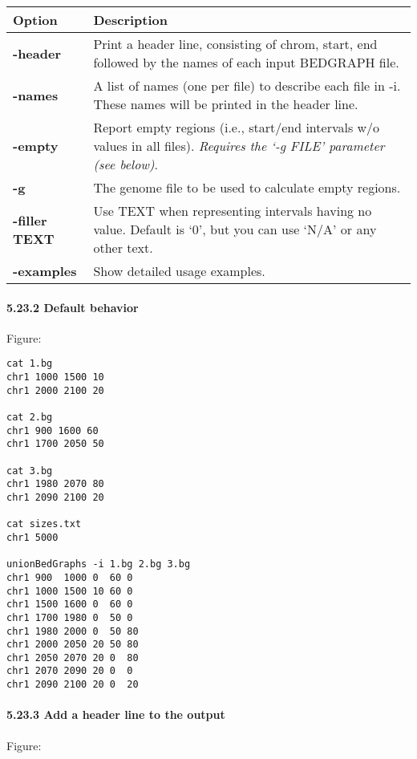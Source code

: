 \documentclass[letterpaper,10pt,english]{sphinxmanual}
\begin{document}
\begin{tabulary}{\linewidth}{|L|L|}
\hline
\textbf{
Option
} & \textbf{
Description
}\\\hline

\textbf{-header}
 & 
Print a header line, consisting of chrom, start, end followed by the names of each input BEDGRAPH file.
\\\hline

\textbf{-names}
 & 
A list of names (one per file) to describe each file in -i. These names will be printed in the header line.
\\\hline

\textbf{-empty}
 & 
Report empty regions (i.e., start/end intervals w/o values in all files). \emph{Requires the `-g FILE' parameter (see below)}.
\\\hline

\textbf{-g}
 & 
The genome file to be used to calculate empty regions.
\\\hline

\textbf{-filler TEXT}
 & 
Use TEXT when representing intervals having no value. Default is `0', but you can use `N/A' or any other text.
\\\hline

\textbf{-examples}
 & 
Show detailed usage examples.
\\\hline
\end{tabulary}



\paragraph{5.23.2 Default behavior}
\label{content/unionBedGraphs:default-behavior}
Figure:

\begin{Verbatim}[commandchars=\\\{\}]
cat 1.bg
chr1 1000 1500 10
chr1 2000 2100 20

cat 2.bg
chr1 900 1600 60
chr1 1700 2050 50

cat 3.bg
chr1 1980 2070 80
chr1 2090 2100 20

cat sizes.txt
chr1 5000

unionBedGraphs -i 1.bg 2.bg 3.bg
chr1 900  1000 0  60 0
chr1 1000 1500 10 60 0
chr1 1500 1600 0  60 0
chr1 1700 1980 0  50 0
chr1 1980 2000 0  50 80
chr1 2000 2050 20 50 80
chr1 2050 2070 20 0  80
chr1 2070 2090 20 0  0
chr1 2090 2100 20 0  20
\end{Verbatim}


\paragraph{5.23.3 Add a header line to the output}
\label{content/unionBedGraphs:add-a-header-line-to-the-output}
Figure:
\end{document}
